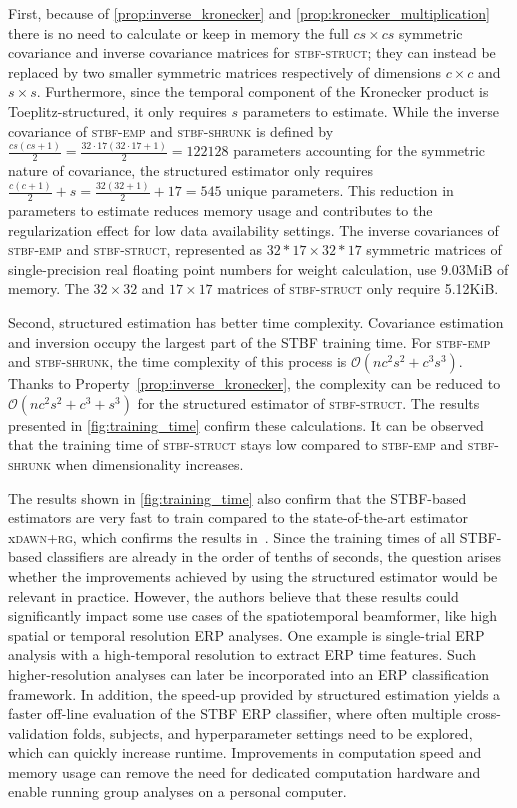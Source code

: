	First, because of \autoref{prop:inverse_kronecker} and
	\autoref{prop:kronecker_multiplication} there is no need to calculate or keep in memory the full $cs\times cs$
	symmetric covariance and inverse covariance matrices for \textsc{stbf-struct}; they can instead be replaced by two smaller symmetric matrices respectively of dimensions $c\times c$ and $s\times s$.
	Furthermore, since the temporal component of the Kronecker product is
	Toeplitz-structured, it only requires $s$ parameters to
	estimate.
	While the inverse covariance of \textsc{stbf-emp} and \textsc{stbf-shrunk} is
	defined by $\frac{cs(cs+1)}{2}=\frac{32\cdot17(32\cdot17+1)}{2}=\num{122128}$
	parameters accounting for the symmetric nature of
	covariance, the structured estimator only requires $\frac{c(c+1)}{2} + s =
		\frac{32(32+1)}{2} + 17=545$ unique parameters.
	This reduction in parameters to estimate reduces memory usage and contributes to the regularization effect for low data availability settings.
	The inverse covariances of \textsc{stbf-emp} and
	\textsc{stbf-struct}, represented as $32*17\times 32*17$ symmetric matrices of
	single-precision real floating point numbers for weight calculation,
	use 9.03MiB of memory.
	The $32\times 32$ and $17\times 17$ matrices of \textsc{stbf-struct} only
	require 5.12KiB.

	Second, structured estimation has better time complexity.
	Covariance estimation and inversion occupy the largest part of the STBF training time.
	For \textsc{stbf-emp} and \textsc{stbf-shrunk}, the time complexity of this process is $\mathcal{O}(nc^2s^2+c^3s^3)$.
	Thanks to Property~\ref{prop:inverse_kronecker}, the complexity can be reduced to
	$\mathcal{O}(nc^2s^2+c^3+s^3)$ for the structured estimator of \textsc{stbf-struct}.
	The results presented in \autoref{fig:training_time} confirm these
	calculations.
	It can be observed that the training time of \textsc{stbf-struct} stays low compared to \textsc{stbf-emp} and \textsc{stbf-shrunk} when dimensionality increases.

	The results shown in \autoref{fig:training_time} also confirm that the
	STBF-based estimators are very fast to train compared to the
	state-of-the-art estimator x\textsc{dawn+rg}, which confirms the results in~\cite{Wittevrongel2016}.
	Since the training times of all STBF-based classifiers are already in
	the order of tenths of seconds, the question arises whether the
	improvements achieved by using the structured estimator would be relevant in
	practice.
	However, the authors believe that these results could significantly impact some
	use cases of the spatiotemporal beamformer, like high spatial or temporal resolution ERP analyses.
	One example is single-trial ERP analysis with a high-temporal
	resolution to extract ERP time features.
	Such higher-resolution analyses can later be incorporated into an ERP
	classification framework.
	In addition, the speed-up provided by structured estimation yields a faster
	off-line evaluation of the STBF ERP classifier, where often multiple cross-validation folds, subjects, and hyperparameter settings need to be explored, which can quickly increase runtime.
	Improvements in computation speed and memory usage can remove the need for dedicated computation hardware and enable running group analyses on a personal computer.

